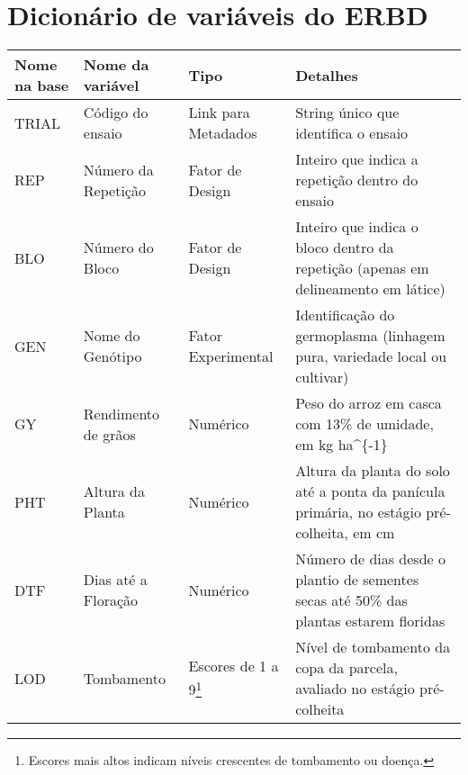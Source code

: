 

\section{Dicionário de variáveis do ERBD}\label{sec: dicionario-erbd2}

\begin{longtable}{@{} p{2.5cm} p{2.5cm} p{2.5cm} p{8.5cm} @{}} 
	\toprule
	\textbf{Nome na base} & \textbf{Nome da variável} & \textbf{Tipo}       & \textbf{Detalhes}                                                                         \\* \midrule
	\endfirsthead
	\endhead
	\bottomrule
	\endfoot
	\endlastfoot
	TRIAL                 & Código do ensaio          & Link para Metadados & String único que identifica o ensaio                                                      \\
	REP                   & Número da Repetição       & Fator de Design     & Inteiro que indica a repetição dentro do ensaio                                           \\
	BLO                   & Número do Bloco           & Fator de Design     & Inteiro que indica o bloco dentro da repetição (apenas em delineamento em látice)         \\
	GEN                   & Nome do Genótipo          & Fator Experimental  & Identificação do germoplasma (linhagem pura, variedade local ou cultivar)                 \\
	GY                    & Rendimento de grãos       & Numérico            & Peso do arroz em casca com 13\% de umidade, em kg ha\textasciicircum{}\{-1\}              \\
	PHT                   & Altura da Planta          & Numérico            & Altura da planta do solo até a ponta da panícula primária, no estágio pré-colheita, em cm \\
	DTF                   & Dias até a Floração       & Numérico            & Número de dias desde o plantio de sementes secas até 50\% das plantas estarem floridas    \\
	LOD                   & Tombamento                & Escores de 1 a 9\footnote{Escores mais altos indicam níveis crescentes de tombamento ou doença.}    & Nível de tombamento da copa da parcela, avaliado no estágio pré-colheita                  \\

\end{longtable}
